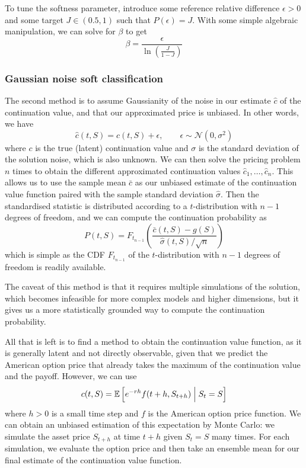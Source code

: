 To tune the softness parameter, introduce some reference relative difference $\epsilon > 0$ and some target $J \in (0.5, 1)$ such that $P(\epsilon) = J$. With some simple algebraic manipulation, we can solve for $\beta$ to get
\begin{equation}
    \beta = \frac{\epsilon}{\ln\left(\frac{J}{1 - J}\right)}
\end{equation}

\subsubsection{Gaussian noise soft classification}

The second method is to assume Gaussianity of the noise in our estimate $\hat c$ of the continuation value, and that our approximated price is unbiased. In other words, we have
\begin{equation}
    \hat c(t, S) = c(t, S) + \epsilon, \qquad \epsilon \sim \mathcal N(0, \sigma^2)
\end{equation}
where $c$ is the true (latent) continuation value and $\sigma$ is the standard deviation of the solution noise, which is also unknown. We can then solve the pricing problem $n$ times to obtain the different approximated continuation values $\hat c_1, \dots, \hat c_n$. This allows us to use the sample mean $\bar c$ as our unbiased estimate of the continuation value function paired with the sample standard deviation $\hat \sigma$. Then the standardised statistic is distributed according to a $t$-distribution with $n-1$ degrees of freedom, and we can compute the continuation probability as
\begin{equation}
    P(t,S) = F_{t_{n-1}}\!\left(\frac{\bar c(t,S) - g(S)}{\hat\sigma(t,S)/\sqrt n}\right)
\end{equation}
which is simple as the CDF $F_{t_{n-1}}$ of the $t$-distribution with $n-1$ degrees of freedom is readily available.

The caveat of this method is that it requires multiple simulations of the solution, which becomes infeasible for more complex models and higher dimensions, but it gives us a more statistically grounded way to compute the continuation probability.

All that is left is to find a method to obtain the continuation value function, as it is generally latent and not directly observable, given that we predict the American option price that already takes the maximum of the continuation value and the payoff. However, we can use
\begin{equation}
    c(t, S) = \mathbb E\left[e^{-rh} f(t+h, S_{t+h})\Bigm| S_t = S\right]
\end{equation}
where $h > 0$ is a small time step and $f$ is the American option price function. We can obtain an unbiased estimation of this expectation by Monte Carlo: we simulate the asset price $S_{t+h}$ at time $t+h$ given $S_t=S$ many times. For each simulation, we evaluate the option price and then take an ensemble mean for our final estimate of the continuation value function.

